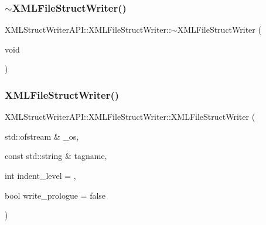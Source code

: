 \subsubsection{\texorpdfstring{$\sim$XMLFileStructWriter()}{~XMLFileStructWriter()}\hspace{0.1cm}{\footnotesize\ttfamily [1/3]}}
{\footnotesize\ttfamily X\+M\+L\+Struct\+Writer\+A\+P\+I\+::\+X\+M\+L\+File\+Struct\+Writer\+::$\sim$\+X\+M\+L\+File\+Struct\+Writer (\begin{DoxyParamCaption}\item[{void}]{ }\end{DoxyParamCaption})\hspace{0.3cm}{\ttfamily [inline]}}

\mbox{\label{classXMLStructWriterAPI_1_1XMLFileStructWriter_a7045796a887cf66a8ee5a355a1f3c4a9}} 
\subsubsection{\texorpdfstring{XMLFileStructWriter()}{XMLFileStructWriter()}\hspace{0.1cm}{\footnotesize\ttfamily [2/3]}}
{\footnotesize\ttfamily X\+M\+L\+Struct\+Writer\+A\+P\+I\+::\+X\+M\+L\+File\+Struct\+Writer\+::\+X\+M\+L\+File\+Struct\+Writer (\begin{DoxyParamCaption}\item[{std\+::ofstream \&}]{\+\_\+os,  }\item[{const std\+::string \&}]{tagname,  }\item[{int}]{indent\+\_\+level = {},  }\item[{bool}]{write\+\_\+prologue = {\ttfamily false} }\end{DoxyParamCaption})\hspace{0.3cm}{\ttfamily [inline]}}

